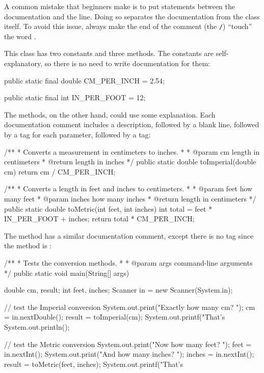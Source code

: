 A common mistake that beginners make is to put  statements between the documentation and the  line.
Doing so separates the documentation from the class itself.
To avoid this issue, always make the end of the comment (the \textcolor{comment}{\tt */}) ``touch'' the word .

This class has two constants and three methods.
The constants are self-explanatory, so there is no need to write documentation for them:

\begin{code}
public static final double CM_PER_INCH = 2.54;

public static final int IN_PER_FOOT = 12;
\end{code}

The methods, on the other hand, could use some explanation.
Each documentation comment includes a description, followed by a blank line, followed by a  tag for each parameter, followed by a  tag:

\begin{code}
/**
 * Converts a measurement in centimeters to inches.
 *
 * @param cm length in centimeters
 * @return length in inches
 */
public static double toImperial(double cm) {
    return cm / CM_PER_INCH;
}
\end{code}

\begin{code}
/**
 * Converts a length in feet and inches to centimeters.
 *
 * @param feet how many feet
 * @param inches how many inches
 * @return length in centimeters
 */
public static double toMetric(int feet, int inches) {
    int total = feet * IN_PER_FOOT + inches;
    return total * CM_PER_INCH;
}
\end{code}

The  method has a similar documentation comment, except there is no  tag since the method is :

\begin{code}
/**
 * Tests the conversion methods.
 *
 * @param args command-line arguments
 */
public static void main(String[] args) {
    double cm, result;
    int feet, inches;
    Scanner in = new Scanner(System.in);

    // test the Imperial conversion
    System.out.print("Exactly how many cm? ");
    cm = in.nextDouble();
    result = toImperial(cm);
    System.out.printf("That's %
    System.out.println();

    // test the Metric conversion
    System.out.print("Now how many feet? ");
    feet = in.nextInt();
    System.out.print("And how many inches? ");
    inches = in.nextInt();
    result = toMetric(feet, inches);
    System.out.printf("That's %
}
\end{code}

